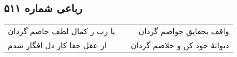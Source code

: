 \begin{center}
\section*{رباعی شماره ۵۱۱}
\label{sec:sh511}
\begin{longtable}{l p{0.5cm} r}
یا رب ز کمال لطف خاصم گردان
&&
واقف بحقایق خواصم گردان
\\
از عقل جفا کار دل افگار شدم
&&
دیوانهٔ خود کن و خلاصم گردان
\\
\end{longtable}
\end{center}
